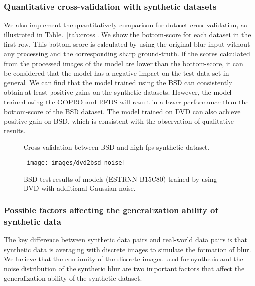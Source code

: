 \documentclass[twocolumn]{svjour3}          \smartqed  \usepackage{graphicx}
\begin{document}
\subsubsection{Quantitative cross-validation with synthetic datasets}
We also implement the quantitatively comparison for dataset cross-validation, as illustrated in Table.~\ref{tab:cross}. We show the bottom-score for each dataset in the first row. This bottom-score is calculated by using the original blur input without any processing and the corresponding sharp ground-truth. If the scores calculated from the processed images of the model are lower than the bottom-score, it can be considered that the model has a negative impact on the test data set in general. We can find that the model trained using the BSD can consistently obtain at least positive gains on the synthetic datasets. However, the model trained using the GOPRO and REDS will result in a lower performance than the bottom-score of the BSD dataset. The model trained on DVD can also achieve positive gain on BSD, which is consistent with the observation of qualitative results.

\begin{figure*}[!ht]
	\centering
{}
	\hfil
	\caption{Cross-validation between BSD and high-fps synthetic dataset.}
	\label{fig:cross_bsd_highfps}
\end{figure*}

\begin{figure*}[h]
	\centering
\texttt{[image: images/dvd2bsd\_noise]}
	\caption{BSD test results of models (ESTRNN B15C80) trained by using DVD with additional Gaussian noise.}
	\label{fig:dvd2bsd_noise}
\end{figure*}

\subsubsection{Possible factors affecting the generalization ability of synthetic data}
The key difference between synthetic data pairs and real-world data pairs is that synthetic data is averaging with discrete images to simulate the formation of blur. We believe that the continuity of the discrete images used for synthesis and the noise distribution of the synthetic blur are two important factors that affect the generalization ability of the synthetic dataset.
\end{document}
